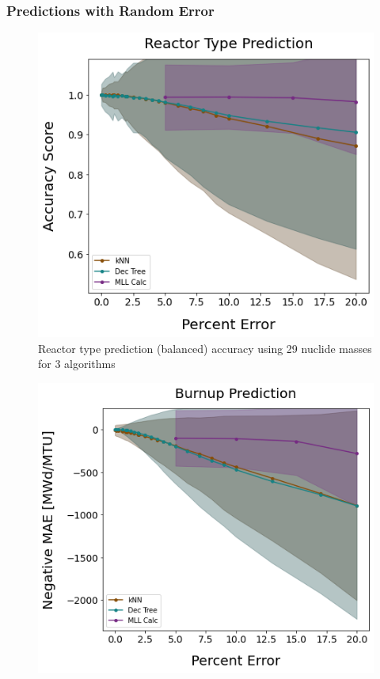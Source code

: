 \begin{frame}
  \frametitle{Predictions with Random Error}
  \begin{adjustwidth}{-15pt}{0pt}
  \begin{minipage}{0.5\textwidth}
    \begin{figure}
      \centering
      \includegraphics[width=1.03\linewidth]{./figures/randerr_compare_nuc29_rxtr.png}
      \caption{Reactor type prediction (balanced) accuracy using 29 nuclide masses for 3 algorithms}
    \end{figure}
  \end{minipage}%
  \hfill
  \begin{minipage}{0.5\textwidth}
    \begin{figure}
      \centering
      \includegraphics[width=1.08\linewidth]{./figures/randerr_compare_nuc29_burn.png}

\end{figure}
\end{minipage}
\end{adjustwidth}
\end{frame}
